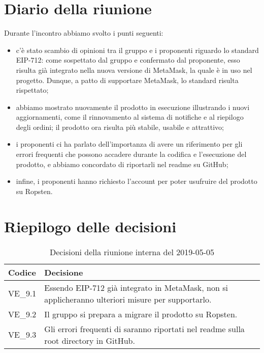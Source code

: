 \section{Diario della riunione}
Durante l'incontro abbiamo svolto i punti seguenti:
\begin{itemize}
	\item c'è stato scambio di opinioni tra il gruppo e i proponenti riguardo lo standard EIP-712: come sospettato dal gruppo e confermato dal proponente, esso risulta già integrato nella nuova versione di MetaMask, la quale è in uso nel progetto. Dunque, a patto di supportare MetaMask, lo standard risulta rispettato;
	\item abbiamo mostrato nuovamente il prodotto in esecuzione illustrando i nuovi aggiornamenti, come il rinnovamento al sistema di notifiche e al riepilogo degli ordini; il prodotto ora risulta più stabile, usabile e attrattivo;
	\item i proponenti ci ha parlato dell'importanza di avere un riferimento per gli errori frequenti che possono accadere durante la codifica e l'esecuzione del prodotto, e abbiamo concordato di riportarli nel readme su GitHub;
	\item infine, i proponenti hanno richiesto l'account per poter usufruire del prodotto su Ropsten.
\end{itemize}

\hspace{3cm}

\section{Riepilogo delle decisioni}

	
	\begin{longtable}{ >{\centering}p{} >{}p{}}
		\caption{Decisioni della riunione interna del 2019-05-05}\\	
		\rowcolorhead
		\textbf{\color{white}Codice} 
		& \centering\textbf{\color{white}Decisione} 
		\tabularnewline 
		
		\endfirsthead
		VE\_9.1 & Essendo EIP-712 già integrato in MetaMask, non si applicheranno ulteriori misure per supportarlo.
		\tabularnewline
		
		VE\_9.2 & Il gruppo si prepara a migrare il prodotto su Ropsten.
		\tabularnewline
		
		VE\_9.3 & Gli errori frequenti di  saranno riportati nel readme sulla root directory in GitHub.
	\end{longtable}
	




